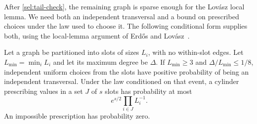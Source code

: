 After \eqref{sel:tail-check}, the remaining graph is sparse enough
for the Lov\'asz local lemma.  We need both an independent transversal
and a bound on prescribed choices under the law used to choose it.
The following conditional form supplies both, using the local-lemma
argument of Erd\H{o}s and Lov\'asz~\cite[Section~2]{ErdosLovasz1975}.

\begin{lemma}\label{sel:tail-cylinder}
Let a graph be partitioned into slots of sizes $L_i$, with no
within-slot edges.  Let $L_{\min}=\min_iL_i$ and let its maximum
degree be $\Delta$.  If $L_{\min}\ge3$ and
$\Delta/L_{\min}\le1/8$, independent uniform choices from the
slots have positive probability of being an independent transversal.
Under the law conditioned on that event, a cylinder prescribing
values in a set $J$ of $s$ slots has probability at most
\begin{equation}\label{sel:tail-cylinder-bound}
 e^{s/2}\prod_{i\in J}L_i^{-1}.
\end{equation}
An impossible prescription has probability zero.
\end{lemma}

